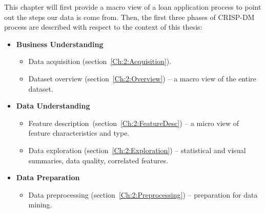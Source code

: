  
This chapter will first provide a macro view of a loan application process to point out the steps our data is come from. Then, the first three phases of CRISP-DM process are described with respect to the context of this thesis:
\begin{itemize}
    \item \textbf{Business Understanding }  
    \begin{itemize}
        \item Data acquisition (section~\ref{Ch:2:Acquisition}). 
        \item Dataset overview (section~\ref{Ch:2:Overview}) -- a macro view of the entire dataset.
    \end{itemize}
    \item \textbf{Data Understanding }
        \begin{itemize}
            \item Feature description~(section~\ref{Ch:2:FeatureDesc}) -- a micro view of feature characteristics and type.
            \item Data exploration (section~\ref{Ch:2:Exploration}) -- statistical and visual summaries, data quality, correlated features.
        \end{itemize}
    \item \textbf{Data Preparation }
            \begin{itemize}
                \item Data preprocessing (section~\ref{Ch:2:Preprocessing}) -- preparation for data mining.
        \end{itemize}
\end{itemize}

